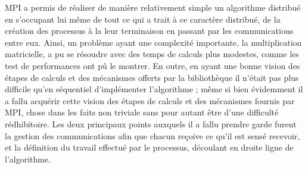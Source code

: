 \documentclass[a4paper,11pt]{article}
\begin{document}
MPI a permis de réaliser de manière relativement simple un algorithme distribué en s'occupant lui même de tout ce qui a trait à ce caractère distribué, de la création des processus à la leur terminaison en passant par les communications entre eux. Ainsi, un problème ayant une complexité importante, la multiplication matricielle, a pu se résoudre avec des temps de calculs plus modestes, comme les test de performances ont pû le montrer. En outre, en ayant une bonne vision des étapes de calculs et des mécanismes offerts par la bibliothèque il n'était pas plus difficile qu'en séquentiel d'implémenter l'algorithme ; même si bien évidemment il a fallu acquérir cette vision des étapes de calculs et des mécanismes fournis par MPI, chose dans les faits non triviale sans pour autant être d'une difficulté rédhibitoire. Les deux principaux points auxquels il a fallu prendre garde furent la gestion des communications afin que chacun reçoive ce qu'il est sensé recevoir, et la définition du travail effectué par le processus, découlant en droite ligne de l'algorithme.
\end{document}

